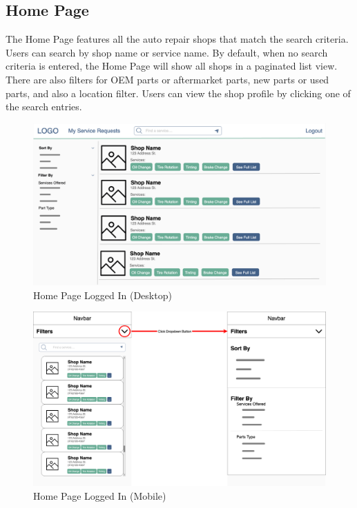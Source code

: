 \documentclass[12pt, titlepage]{article}
\begin{document}
\subsection{Home Page}
The Home Page features all the auto repair shops that match the search criteria. Users can search by shop
name or service name. By default, when no search criteria is entered, the Home Page will show all
shops in a paginated list view. There are also filters for OEM parts or aftermarket parts, new
parts or used parts, and also a location filter. Users can view the shop profile by clicking one of
the search entries.
\begin{figure}[H]
	\centering
	\includegraphics[width=\textwidth]{mockups/Home Page (Logged In) (Desktop).png}
	\caption{Home Page \textemdash{} Logged In (Desktop)}
\end{figure}

\begin{figure}[H]
	\centering
	\includegraphics[width=\textwidth]{mockups/Home Page (Mobile).png}
	\caption{Home Page \textemdash{} Logged In (Mobile)}
\end{figure}
\end{document}

